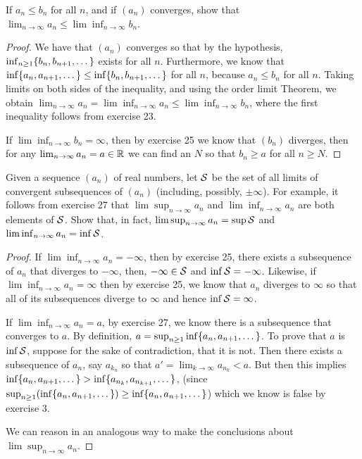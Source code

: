 \begin{exercise}{30}
If $a_n\leq b_n$ for all $n$, and if $(a_n)$ converges, show that $\lim_{n\to\infty}a_n\leq\lim\inf_{n\to\infty}b_n$.
\end{exercise}
\begin{proof}
We have that $(a_n)$ converges so that by the hypothesis, $\inf_{n\geq 1}\{b_n,b_{n+1},\dots\}$ exists for all $n$. Furthermore, we know that $\inf\{a_n,a_{n+1},\dots\}\leq\inf\{b_n,b_{n+1},\dots\}$ for all $n$, because $a_n\leq b_n$ for all $n$. Taking limits on both sides of the inequality, and using the order limit Theorem, we obtain $\lim_{n\to\infty}a_n=\lim\inf_{n\to\infty}a_n\leq\lim\inf_{n\to\infty}b_n$, where the first inequality follows from exercise 23.

If $\lim\inf_{n\to\infty}b_n=\infty$, then by exercise 25 we know that $(b_n)$ diverges, then for any $\lim_{n\to\infty}a_n=a\in\mathbb{R}$ we can find an $N$ so that $b_n\geq a$ for all $n\geq N$.
\end{proof}

\begin{exercise}{32}
Given a sequence $(a_n)$ of real numbers, let $\mathcal{S}$ be the set of all limits of convergent subsequences of $(a_n)$ (including, possibly, $\pm\infty$). For example, it follows from exercise 27 that $\lim\sup_{n\to\infty}a_n$ and $\lim\inf_{n\to\infty}a_n$ are both elements of $\mathcal{S}$. Show that, in fact, $\lim\sup_{n\to\infty}a_n= \sup\mathcal{S}$ and $\lim\inf_{n\to\infty}a_n= \inf\mathcal{S}$.
\end{exercise}
\begin{proof}
If $\lim\inf_{n\to\infty}a_n=-\infty$, then by exercise 25, there exists a subsequence of $a_n$ that diverges to $-\infty$, then, $-\infty\in\mathcal{S}$ and $\inf\mathcal{S} =-\infty$. Likewise, if $\lim\inf_{n\to\infty}a_n=\infty$ then by exercise 25, we know that $a_n$ diverges to $\infty$ so that all of its subsequences diverge to $\infty$ and hence $\inf\mathcal{S} =\infty$.

If $\lim\inf_{n\to\infty}a_n=a$, by exercise 27, we know there is a subsequence that converges to $a$. By definition, $a =\sup_{n\geq 1}\inf\{a_n,a_{n+1},\dots\}$. To prove that $a$ is $\inf\mathcal{S}$, suppose for the sake of contradiction, that it is not. Then there exists a subsequence of $a_n$, say $a_{k_n}$ so that $a'=\lim_{k\to\infty}a_{n_k}<a$. But then this implies $\inf\{a_n,a_{n+1},\dots\}>\inf\{a_{n_k},a_{n_{k+1}},\dots\}$, (since $\sup_{n\geq 1}(\inf\{a_n,a_{n+1},\dots\})\geq\inf\{a_n,a_{n+1},\dots\}$) which we know is false by exercise 3. 

We can reason in an analogous way to make the conclusions about $\lim\sup_{n\to\infty}a_n$. 
\end{proof}

